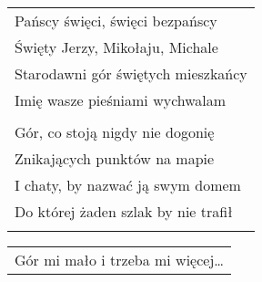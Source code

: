 \documentclass[a5paper]{article}
\begin{document}
\noindent
\begin{tabular}{@{}p{8.50cm}@{}}
Pańscy święci, święci bezpańscy \\
Święty Jerzy, Mikołaju, Michale \\
Starodawni gór świętych mieszkańcy \\
Imię wasze pieśniami wychwalam \\ \\

Gór, co stoją nigdy nie dogonię \\
Znikających punktów na mapie \\
I chaty, by nazwać ją swym domem \\
Do której żaden szlak by nie trafił \\ \\
\end{tabular}

\noindent
\begin{tabular}{@{}p{7.50cm}@{}}
Gór mi mało i trzeba mi więcej…
\end{tabular}
\end{document}
